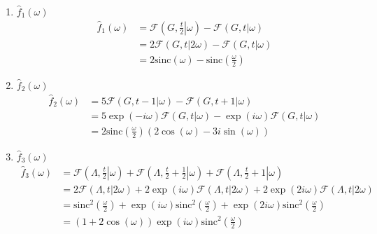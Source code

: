 \documentclass[a4paper,12pt,final]{article}
\begin{document}
      \begin{enumerate}[label=\alph*)]
        \item $\widehat{f}_{1}\left(\omega\right)$
          \begin{equation*}
            \begin{split}
              \widehat{f}_{1}\left(\omega\right) & = \mathcal{F}\left(G,\left.\frac{t}{2}\right|\omega\right) - \mathcal{F}\left(G,t|\omega\right) \\
                                                 & = 2\mathcal{F}\left(G,t|2\omega\right) - \mathcal{F}\left(G,t|\omega\right) \\
                                                 & = 2\mathrm{sinc}\left(\omega\right) - \mathrm{sinc}\left(\frac{\omega}{2}\right)
            \end{split}
          \end{equation*}

        \item $\widehat{f}_{2}\left(\omega\right)$
          \begin{equation*}
            \begin{split}
              \widehat{f}_{2}\left(\omega\right) & = 5\mathcal{F}\left(G,t-1|\omega\right) - \mathcal{F}\left(G,t+1|\omega\right) \\
                                                 & = 5\exp\left(-i \omega\right)\mathcal{F}\left(G,t|\omega\right) - \exp\left(i \omega\right)\mathcal{F}\left(G,t|\omega\right) \\
                                                 & = 2\mathrm{sinc}\left(\frac{\omega}{2}\right)\left(2\cos\left(\omega\right) - 3i\sin\left(\omega\right) \right)
            \end{split}
          \end{equation*}

        \item $\widehat{f}_{3}\left(\omega\right)$
          \begin{equation*}
            \begin{split}
              \widehat{f}_{3}\left(\omega\right) & = \mathcal{F}\left(\Lambda,\left.\frac{t}{2}\right|\omega\right) + \mathcal{F}\left(\Lambda,\left.\frac{t}{2} + \frac{1}{2}\right|\omega\right) + \mathcal{F}\left(\Lambda,\left.\frac{t}{2} + 1\right|\omega\right) \\
                                                 & = 2 \mathcal{F}\left(\Lambda,t| 2 \omega\right) + 2 \exp\left(i \omega\right) \mathcal{F}\left(\Lambda,t|2 \omega\right) + 2 \exp\left(2 i \omega\right) \mathcal{F}\left(\Lambda,t| 2\omega\right) \\
                                                 & = \mathrm{sinc}^{2}\left(\frac{\omega}{2}\right) + \exp\left(i \omega\right) \mathrm{sinc}^{2}\left(\frac{\omega}{2}\right) + \exp\left(2 i \omega\right) \mathrm{sinc}^{2}\left(\frac{\omega}{2}\right) \\
                                                 & = \left(1 + 2 \cos\left(\omega\right) \right)\exp\left(i \omega\right)\mathrm{sinc}^{2}\left(\frac{\omega}{2}\right)
            \end{split}
          \end{equation*}


\end{enumerate}
\end{document}
